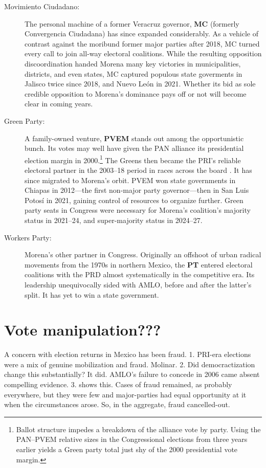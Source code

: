 \documentclass[letter,12pt]{article}
\begin{document}
\begin{description}
\item[Movimiento Ciudadano:] The personal machine of a former Veracruz governor, \textbf{MC} (formerly Convergencia Ciudadana) has since expanded considerably. As a vehicle of contrast against the moribund former major parties after 2018, MC turned every call to join all-way electoral coalitions. While the resulting opposition discoordination handed Morena many key victories in municipalities, districts, and even states, MC captured populous state goverments in Jalisco twice since 2018, and Nuevo León in 2021. Whether its bid as sole credible opposition to Morena's dominance pays off or not will become clear in coming years.

\item[Green Party:] A family-owned venture, \textbf{PVEM} stands out among the opportunistic bunch. Its votes may well have given the PAN alliance its presidential election margin in 2000.\footnote{Ballot structure impedes a breakdown of the alliance vote by party. Using the PAN--PVEM relative sizes in the Congressional elections from three years earlier yields a Green party total just shy of the 2000 presidential vote margin.} The Greens then became the PRI's reliable electoral partner in the 2003--18 period in races across the board \citep{spoon.pulido.PRI-PVEM2017}. It has since migrated to Morena's orbit. PVEM won state governments in Chiapas in 2012---the first non-major party governor---then in San Luis Potosí in 2021, gaining control of resources to organize further. Green party seats in Congress were necessary for Morena's coalition's majority status in 2021--24, and super-majority status in 2024--27.

\item[Workers Party:] Morena's other partner in Congress. Originally an offshoot of urban radical movements from the 1970s in northern Mexico, the \textbf{PT} entered electoral coalitions with the PRD almost systematically in the competitive era. Its leadership unequivocally sided with AMLO, before and after the latter's split. It has yet to win a state government. 
\end{description}

\section{Vote manipulation???}
A concern with election returns in Mexico has been fraud.
1. PRI-era elections were a mix of genuine mobilization and fraud. Molinar.
2. Did democractization change this substantially? It did. AMLO's failure to concede in 2006 came absent compelling evidence.
3. \citep{cantuContiguas2014ajps} shows this. Cases of fraud remained, as probably everywhere, but they were few and major-parties had equal opportunity at it when the circumstances arose. So, in the aggregate, fraud cancelled-out. 
\end{document}
